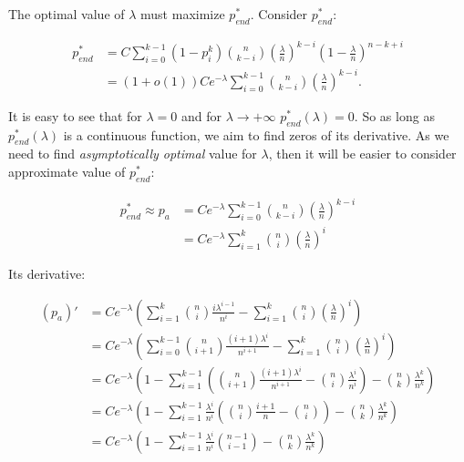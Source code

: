 \documentclass{article}
\begin{document}
The optimal value of $\lambda$ must maximize $p_{end}^*$. Consider $p_{end}^*:$

\begin{align*}
p_{end}^* &= C\sum\limits_{i = 0}^{k - 1} (1 - p_i^k) \binom{n}{k - i} \left( \frac{\lambda}{n} \right)^{k - i}  \left(1 - \frac{\lambda}{n} \right)^{n - k + i} \\
&= (1 + o(1))Ce^{-\lambda}\sum\limits_{i = 0}^{k - 1} \binom{n}{k - i} \left( \frac{\lambda}{n} \right)^{k - i}.
\end{align*}

It is easy to see that for $\lambda = 0$ and for $\lambda \to +\infty$ $p_{end}^*(\lambda) = 0$. So as long as $p_{end}^*(\lambda)$ is a continuous function, we aim to find zeros of its derivative. As we need to find \textit{asymptotically optimal} value for $\lambda$, then it will be easier to consider approximate value of $p_{end}^*:$

\begin{align*}
 p_{end}^*  \approx p_a &= Ce^{-\lambda}\sum\limits_{i = 0}^{k - 1} \binom{n}{k - i} \left( \frac{\lambda}{n} \right)^{k - i} \\
                        &= Ce^{-\lambda}\sum\limits_{i = 1}^{k} \binom{n}{i} \left( \frac{\lambda}{n} \right)^{i}
\end{align*}

Its derivative:

\begin{align*}
(p_a)' &= Ce^{-\lambda}(\sum\limits_{i = 1}^{k} \binom{n}{i} \frac{i\lambda^{i - 1}}{n^i} - \sum\limits_{i = 1}^{k} \binom{n}{i} \left( \frac{\lambda}{n} \right)^{i}) \\
       &= Ce^{-\lambda}(\sum\limits_{i = 0}^{k - 1} \binom{n}{i + 1} \frac{(i + 1)\lambda^i}{n^{i + 1}} - \sum\limits_{i = 1}^{k} \binom{n}{i} \left( \frac{\lambda}{n} \right)^{i}) \\
       &= Ce^{-\lambda}\left(1 - \sum\limits_{i = 1}^{k - 1} \left(\binom{n}{i + 1} \frac{(i + 1)\lambda^{i}}{n^{i + 1}} - \binom{n}{i} \frac{\lambda^i}{n^i} \right) - \binom{n}{k} \frac{\lambda^k}{n^k} \right) \\
       &= Ce^{-\lambda}\left(1 - \sum\limits_{i = 1}^{k - 1} \frac{\lambda^i}{n^i} \left(\binom{n}{i} \frac{i + 1}{n} - \binom{n}{i} \right) - \binom{n}{k} \frac{\lambda^k}{n^k} \right) \\
       &= Ce^{-\lambda}\left(1 - \sum\limits_{i = 1}^{k - 1} \frac{\lambda^i}{n^i} \binom{n - 1}{i - 1} - \binom{n}{k} \frac{\lambda^k}{n^k} \right) \\
\end{align*}
\end{document}
